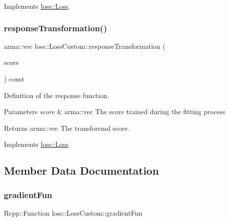 Implements \hyperlink{classloss_1_1_loss_ae9f94dd9b8311397583ba3a9cb485e94}{loss\+::\+Loss}.

\mbox{\label{classloss_1_1_loss_custom_a42d9a0131836a056551c1073474cc8b9}} 
\subsubsection{\texorpdfstring{response\+Transformation()}{responseTransformation()}}
{\footnotesize\ttfamily arma\+::vec loss\+::\+Loss\+Custom\+::response\+Transformation (\begin{DoxyParamCaption}\item[{const arma\+::vec \&}]{score }\end{DoxyParamCaption}) const\hspace{0.3cm}{\ttfamily [virtual]}}



Definition of the response function. 


\begin{DoxyParams}{Parameters}
{\em score} & {\ttfamily arma\+::vec} The score trained during the fitting process\\
\hline
\end{DoxyParams}
\begin{DoxyReturn}{Returns}
{\ttfamily arma\+::vec} The transforemd score. 
\end{DoxyReturn}


Implements \hyperlink{classloss_1_1_loss_a0a84b7df79b08e40b538aaa7e6ee75c4}{loss\+::\+Loss}.



\subsection{Member Data Documentation}
\mbox{\label{classloss_1_1_loss_custom_a320a637329b5ae7d60c9493dc757c077}} 
\subsubsection{\texorpdfstring{gradient\+Fun}{gradientFun}}
{\footnotesize\ttfamily Rcpp\+::\+Function loss\+::\+Loss\+Custom\+::gradient\+Fun\hspace{0.3cm}{\ttfamily [private]}}



